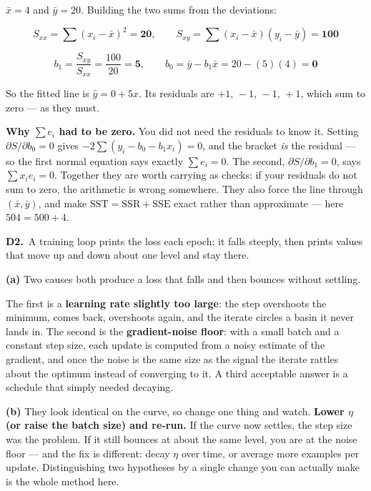\documentclass[10pt,a4paper]{article}
\newcommand{\sol}[1]{\textbf{#1}}
\begin{document}
\vspace{2pt}

$\bar x = 4$ and $\bar y = 20$. Building the two sums from the deviations:

\[ S_{xx} = \sum (x_i-\bar x)^2 = \sol{20}, \qquad S_{xy} = \sum (x_i-\bar x)(y_i-\bar y) = \sol{100} \]

\[ b_1 = \frac{S_{xy}}{S_{xx}} = \frac{100}{20} = \sol{5}, \qquad b_0 = \bar y - b_1\bar x = 20 - (5)(4) = \sol{0} \]

So the fitted line is $\hat y = 0 + 5 x$. Its residuals are $+1,\,-1,\,-1,\,+1$, which sum to zero --- as they must.

\vspace{2pt}

\textbf{Why $\sum e_i$ had to be zero.} You did not need the residuals to know it. Setting $\partial S/\partial b_0 = 0$ gives $-2\sum(y_i - b_0 - b_1x_i) = 0$, and the bracket \emph{is} the residual --- so the first normal equation says exactly $\sum e_i = 0$. The second, $\partial S/\partial b_1 = 0$, says $\sum x_ie_i = 0$. Together they are worth carrying as checks: if your residuals do not sum to zero, the arithmetic is wrong somewhere. They also force the line through $(\bar x, \bar y)$, and make $\mathrm{SST} = \mathrm{SSR} + \mathrm{SSE}$ exact rather than approximate --- here $504 = 500 + 4$.

\vspace{6pt}

\textbf{D2.}\ A training loop prints the loss each epoch: it falls steeply, then prints values that move up and down about one level and stay there.

\vspace{2pt}

\textbf{(a)} Two causes both produce a loss that falls and then bounces without settling.\par\vspace{1mm}The first is a \textbf{learning rate slightly too large}: the step overshoots the minimum, comes back, overshoots again, and the iterate circles a basin it never lands in. The second is the \textbf{gradient-noise floor}: with a small batch and a constant step size, each update is computed from a noisy estimate of the gradient, and once the noise is the same size as the signal the iterate rattles about the optimum instead of converging to it. A third acceptable answer is a schedule that simply needed decaying.\par\vspace{1mm}\textbf{(b)} They look identical on the curve, so change one thing and watch. \textbf{Lower $\eta$ (or raise the batch size) and re-run.} If the curve now settles, the step size was the problem. If it still bounces at about the same level, you are at the noise floor --- and the fix is different: decay $\eta$ over time, or average more examples per update. Distinguishing two hypotheses by a single change you can actually make is the whole method here.
\end{document}
